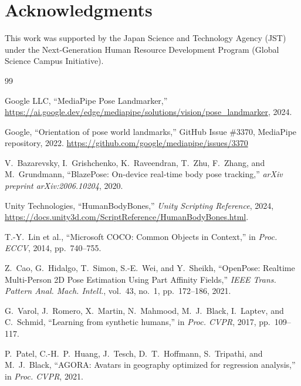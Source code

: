\documentclass[twocolumn]{article}
\begin{document}
\section*{Acknowledgments}

This work was supported by the Japan Science and Technology Agency (JST)
under the Next-Generation Human Resource Development Program (Global Science
Campus Initiative).

\begin{thebibliography}{99}

Google LLC, ``MediaPipe Pose Landmarker,''
\url{https://ai.google.dev/edge/mediapipe/solutions/vision/pose_landmarker},
2024.

Google, ``Orientation of pose world landmarks,''
GitHub Issue \#3370, MediaPipe repository, 2022.
\url{https://github.com/google/mediapipe/issues/3370}

V.~Bazarevsky, I.~Grishchenko, K.~Raveendran, T.~Zhu, F.~Zhang,
and M.~Grundmann,
``BlazePose: On-device real-time body pose tracking,''
\textit{arXiv preprint arXiv:2006.10204}, 2020.

Unity Technologies, ``HumanBodyBones,''
\textit{Unity Scripting Reference}, 2024,
\url{https://docs.unity3d.com/ScriptReference/HumanBodyBones.html}.

T.-Y.~Lin et al.,
``Microsoft COCO: Common Objects in Context,''
in \textit{Proc. ECCV}, 2014, pp.~740--755.

Z.~Cao, G.~Hidalgo, T.~Simon, S.-E.~Wei, and Y.~Sheikh,
``OpenPose: Realtime Multi-Person 2D Pose Estimation Using Part Affinity
Fields,''
\textit{IEEE Trans. Pattern Anal. Mach. Intell.}, vol.~43, no.~1,
pp.~172--186, 2021.

G.~Varol, J.~Romero, X.~Martin, N.~Mahmood, M.~J.~Black, I.~Laptev,
and C.~Schmid,
``Learning from synthetic humans,''
in \textit{Proc. CVPR}, 2017, pp.~109--117.

P.~Patel, C.-H.~P.~Huang, J.~Tesch, D.~T.~Hoffmann, S.~Tripathi,
and M.~J.~Black,
``AGORA: Avatars in geography optimized for regression analysis,''
in \textit{Proc. CVPR}, 2021.


\end{thebibliography}
\end{document}

